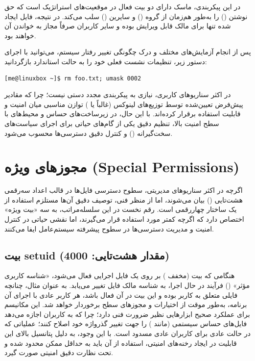 در این پیکربندی، ماسک دارای دو بیت فعال در موقعیت‌های استراتژیک است که حق نوشتن () را به‌طور هم‌زمان از گروه () و سایرین () سلب می‌کند. در نتیجه، فایل ایجاد شده تنها برای مالک قابل ویرایش بوده و سایر کاربران صرفاً مجاز به خواندن آن خواهند بود.

پس از انجام آزمایش‌های مختلف و درک چگونگی تغییر رفتار سیستم، می‌توانید با اجرای دستور زیر، تنظیمات نشست فعلی خود را به حالت استاندارد بازگردانید:

\begin{latin}
\begin{lstlisting}
[me@linuxbox ~]$ rm foo.txt; umask 0002
\end{lstlisting}
\end{latin}

در اکثر سناریوهای کاربری، نیازی به پیکربندی مجدد دستی  نیست؛ چرا که مقادیر پیش‌فرض تعیین‌شده توسط توزیع‌های لینوکس (غالباً  یا ) توازن مناسبی میان امنیت و قابلیت استفاده برقرار کرده‌اند. با این حال، در زیرساخت‌های حساس و محیط‌های با سطح امنیت بالا، تنظیم دقیق  یکی از گام‌های حیاتی برای اجرای سیاست‌های سخت‌گیرانه () و کنترل دقیق دسترسی‌ها محسوب می‌شود.

\section{مجوزهای ویژه (Special Permissions)}

اگرچه در اکثر سناریوهای مدیریتی، سطوح دسترسی فایل‌ها در قالب اعداد سه‌رقمی هشت‌تایی () بیان می‌شوند، اما از منظر فنی، توصیف دقیق آن‌ها مستلزم استفاده از یک ساختار چهاررقمی است. رقم نخست در این سلسله‌مراتب، به سه «بیت ویژه» اختصاص دارد که اگرچه کمتر مورد استفاده قرار می‌گیرند، اما نقشی حیاتی در کنترل امنیت و مدیریت دسترسی‌ها در سطوح پیشرفته سیستم‌عامل ایفا می‌کنند.

\subsection*{بیت setuid (مقدار هشت‌تایی: 4000)}

هنگامی که بیت  (مخفف ) بر روی یک فایل اجرایی فعال می‌شود، «شناسه کاربری مؤثر» () فرآیند در حال اجرا، به شناسه مالک فایل تغییر می‌یابد. به عنوان مثال، چنانچه فایلی متعلق به کاربر  بوده و این بیت در آن فعال باشد، هر کاربر عادی با اجرای آن برنامه، به‌طور موقت از اختیارات و مجوزهای سطح  برخوردار خواهد شد. این مکانیسم برای عملکرد صحیح ابزارهایی نظیر  ضرورت فنی دارد؛ چرا که به کاربران اجازه می‌دهد فایل‌های حساس سیستمی (مانند ) را جهت تغییر گذرواژه خود اصلاح کنند؛ عملیاتی که در حالت عادی برای کاربران عادی مسدود است. با این وجود، به دلیل پتانسیل بالای این قابلیت در ایجاد رخنه‌های امنیتی، استفاده از آن باید به حداقل ممکن محدود شده و تحت نظارت دقیق امنیتی صورت گیرد.

